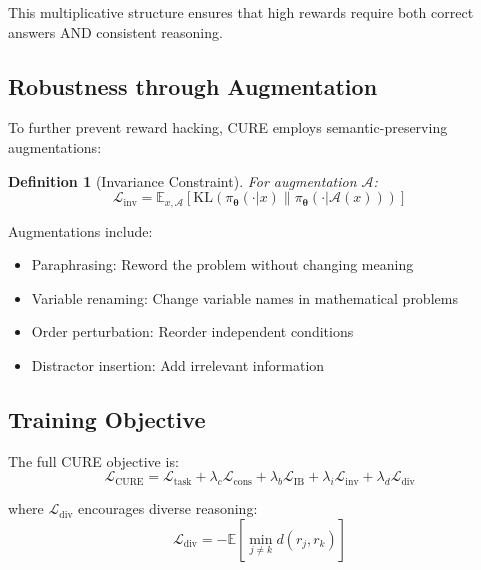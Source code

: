 \documentclass[11pt,a4paper]{article}
\newtheorem{definition}[theorem]{Definition}
\newcommand{\E}{\mathbb{E}}
\newcommand{\KL}{\text{KL}}
\newcommand{\calL}{\mathcal{L}}
\newcommand{\calA}{\mathcal{A}}
\newcommand{\btheta}{\bm{\theta}}
\begin{document}
This multiplicative structure ensures that high rewards require both correct answers AND consistent reasoning.

\subsection{Robustness through Augmentation}

To further prevent reward hacking, CURE employs semantic-preserving augmentations:

\begin{definition}[Invariance Constraint]
For augmentation $\calA$:
\begin{equation}
    \calL_{\text{inv}} = \E_{x, \calA}\left[\KL(\pi_\btheta(\cdot|x) \| \pi_\btheta(\cdot|\calA(x)))\right]
\end{equation}
\end{definition}

Augmentations include:
\begin{itemize}
    \item Paraphrasing: Reword the problem without changing meaning
    \item Variable renaming: Change variable names in mathematical problems
    \item Order perturbation: Reorder independent conditions
    \item Distractor insertion: Add irrelevant information
\end{itemize}

\subsection{Training Objective}

The full CURE objective is:
\begin{equation}
    \calL_{\text{CURE}} = \calL_{\text{task}} + \lambda_c \calL_{\text{cons}} + \lambda_b \calL_{\text{IB}} + \lambda_i \calL_{\text{inv}} + \lambda_d \calL_{\text{div}}
\end{equation}

where $\calL_{\text{div}}$ encourages diverse reasoning:
\begin{equation}
    \calL_{\text{div}} = -\E\left[\min_{j \neq k} d(r_j, r_k)\right]
\end{equation}
\end{document}
